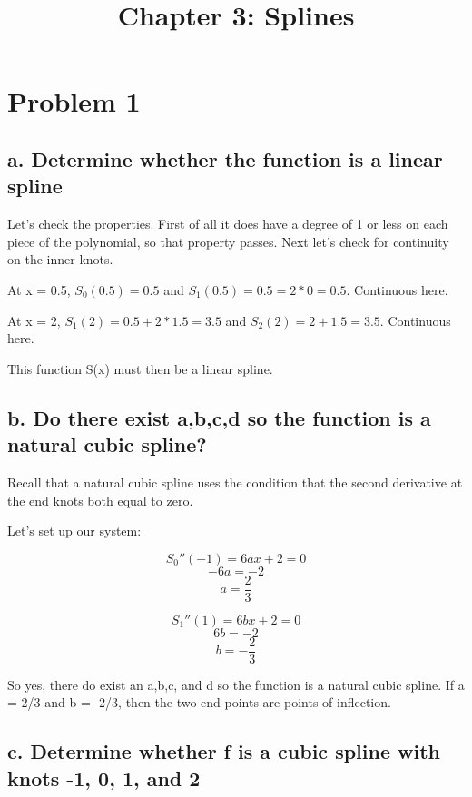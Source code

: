 \documentclass[]{article}
\title{Chapter 3: Splines}
\author{}
\date{}
\begin{document}
\maketitle

{
\setcounter{tocdepth}{2}
\tableofcontents
}
\section{Problem 1}\label{problem-1}

\subsection{a. Determine whether the function is a linear
spline}\label{a.-determine-whether-the-function-is-a-linear-spline}

Let's check the properties. First of all it does have a degree of 1 or
less on each piece of the polynomial, so that property passes. Next
let's check for continuity on the inner knots.

At x = 0.5, \(S_0(0.5) = 0.5\) and \(S_1(0.5) = 0.5 = 2 * 0 = 0.5\).
Continuous here.

At x = 2, \(S_1(2) = 0.5 + 2 * 1.5 = 3.5\) and \(S_2(2)=2 + 1.5 = 3.5\).
Continuous here.

This function S(x) must then be a linear spline.

\subsection{b. Do there exist a,b,c,d so the function is a natural cubic
spline?}\label{b.-do-there-exist-abcd-so-the-function-is-a-natural-cubic-spline}

Recall that a natural cubic spline uses the condition that the second
derivative at the end knots both equal to zero.

Let's set up our system:

\[S_0''(-1) = 6ax + 2 = 0\] \[-6a = -2\] \[a = \frac23\]

\[S_1''(1) = 6bx + 2 = 0\] \[6b = -2\] \[b = -\frac23\]

So yes, there do exist an a,b,c, and d so the function is a natural
cubic spline. If a = 2/3 and b = -2/3, then the two end points are
points of inflection.

\subsection{c. Determine whether f is a cubic spline with knots -1, 0,
1, and
2}\label{c.-determine-whether-f-is-a-cubic-spline-with-knots--1-0-1-and-2}
\end{document}
